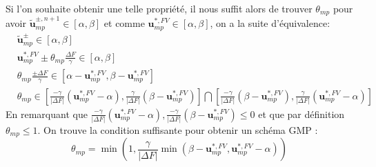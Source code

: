 Si l'on souhaite obtenir une telle propriété, il nous suffit alors de trouver $\theta_{mp}$ pour avoir $\widetilde{\mathbf{u}}_{mp}^{\pm,n+1}\in \left[\alpha,\beta\right]$ et comme $\mathbf{u}_{mp}^{*,FV}\in \left[\alpha,\beta\right]$, on a la suite d'équivalence:
\begin{align*}
    &\widetilde{\mathbf{u}}_{mp}^{\pm}\in \left[\alpha,\beta\right] \\
    &\mathbf{u}_{mp}^{*,FV} \pm \theta_{mp} \frac{\Delta F}{\gamma}\in \left[\alpha,\beta\right] \\
    &\theta_{mp} \frac{\pm \Delta F}{\gamma} \in  \left[\alpha-\mathbf{u}_{mp}^{*,FV},\beta-\mathbf{u}_{mp}^{*,FV}\right] \\
    &\theta_{mp} \in \left[\frac{-\gamma}{|\Delta F|} \left(\mathbf{u}_{mp}^{*,FV} - \alpha \right), \frac{\gamma}{|\Delta F|}\left(\beta-\mathbf{u}_{mp}^{*,FV}     \right) \right] \bigcap 
                     \left[\frac{-\gamma}{|\Delta F|} \left(\beta-\mathbf{u}_{mp}^{*,FV}    \right), \frac{\gamma}{|\Delta F|}\left(\mathbf{u}_{mp}^{*,FV} - \alpha  \right) \right]
\end{align*}
En remarquant que $\frac{-\gamma}{|\Delta F|} \left(\mathbf{u}_{mp}^{*,FV} - \alpha \right),\frac{-\gamma}{|\Delta F|}\left(\beta-\mathbf{u}_{mp}^{*,FV}\right)  \leq 0 $ et que par définition $\theta_{mp} \leq 1$.
On trouve la condition suffisante pour obtenir un schéma GMP : 
\begin{equation}
\theta_{mp} = \min \left(1, \frac{\gamma}{|\Delta F|} \min \left(\beta-\mathbf{u}_{mp}^{*,FV},\mathbf{u}_{mp}^{*,FV} - \alpha  \right) \right) 
\end{equation}

